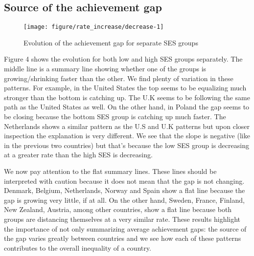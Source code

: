\documentclass[11pt, a4paper]{article}\usepackage[]{graphicx}\usepackage[]{color}
\begin{document}
\subsection{Source of the achievement gap}

\begin{figure}

{\centering \texttt{[image: figure/rate\_increase/decrease-1]} 

}

\caption[Evolution of the achievement gap for separate SES groups]{Evolution of the achievement gap for separate SES groups}\label{fig:rate_increase/decrease}
\end{figure}



Figure 4 shows the evolution for both low and high SES groups separately. The middle line is a summary line showing whether one of the groups is growing/shrinking faster than the other. We find plenty of variation in these patterns. For example, in the United States the top seems to be equalizing much stronger than the bottom is catching up. The U.K seems to be following the same path as the United States as well. On the other hand, in Poland the gap seems to be closing because the bottom SES group is catching up much faster. The Netherlands shows a similar pattern as the U.S and U.K patterns but upon closer inspection the explanation is very different. We see that the slope is negative (like in the previous two countries) but that's because the low SES group is decreasing at a greater rate than the high SES is decreasing.

We now pay attention to the flat summary lines. These lines should be interpreted with caution because it does not mean that the gap is not changing. Denmark, Belgium, Netherlands, Norway and Spain show a flat line because the gap is growing very little, if at all. On the other hand, Sweden, France, Finland, New Zealand, Austria, among other countries, show a flat line because both groups are distancing themselves at a very similar rate. These results highlight the importance of not only summarizing average achievement gaps: the source of the gap varies greatly between countries and we see how each of these patterns contributes to the overall inequality of a country.
\end{document}
